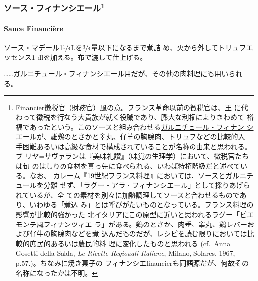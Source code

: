 \hypertarget{ux30bdux30fcux30b9ux30d5ux30a3ux30caux30f3ux30b7ux30a8ux30fcux30eb34}{%
\subsubsection[ソース・フィナンシエール]{\texorpdfstring{ソース・フィナンシエール\footnote{Financier徴税官（財務官）風の意。フランス革命以前の徴税官は、王
  に代わって徴税を行なう大貴族が就く役職であり、膨大な利権によりきわめて
  裕福であったという。このソースと組み合わせる\href{}{ガルニチュール・フィナン
  シエール}が、雄鶏のとさかと睾丸、仔羊の胸腺肉、トリュフなどの比較的入
  手困難あるいは高級な食材で構成されていることが名称の由来と思われる。ブ
  リヤ=サヴァランは『美味礼讃』（味覚の生理学）において、徴税官たちは旬
  のはしりの食材を真っ先に食べられる、いわば特権階級だと述べている。なお、
  カレーム『19世紀フランス料理』においては、ソースとガルニチュールを分離
  せず、「ラグー・アラ・フィナンシエール」として採りあげられているが、全
  ての素材を別々に加熱調理してソースと合わせるものであり、いわゆる「煮込
  み」とは呼びがたいものとなっている。フランス料理の影響が比較的強かった
  北イタリアにこの原型に近いと思われるラグー「ピエモンテ風フィナンツィエ
  ラ」がある。鶏のとさか、肉垂、睾丸、鶏レバーおよび仔牛の胸腺肉などを煮
  込んだものだが、レシピを読む限りにおいては比較的庶民的あるいは農民的料
  理に変化したものと思われる (cf.~Anna Gosetti della Salda, \emph{Le
  Ricette Regionali Italiane}, Milano, Solares, 1967,
  p.57.)。ちなみに焼き菓子の
  フィナンシエfinancierも同語源だが、何故その名称になったかは不明。}}{ソース・フィナンシエール}}\label{ux30bdux30fcux30b9ux30d5ux30a3ux30caux30f3ux30b7ux30a8ux30fcux30eb34}}

\hypertarget{sauce-financiere}{%
\paragraph{Sauce Financière}\label{sauce-financiere}}


\protect\hyperlink{sauce-madere}{ソース・マデール}1\(\sfrac{1}{4}\)Lを\(\sfrac{3}{4}\)量以下になるまで煮詰
め、火から外してトリュフエッセンス1 dlを加える。布で漉して仕上げる。

\ldots{}\ldots{}\href{}{ガルニチュール・フィナンシエール}用だが、その他の肉料理にも用いられる。

